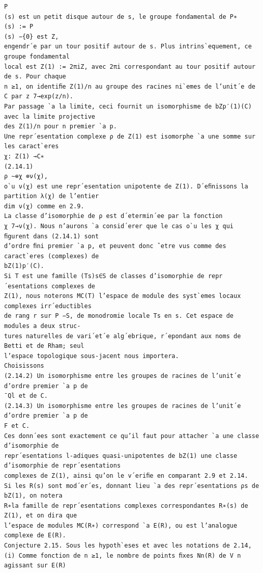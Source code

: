 \documentclass[11pt]{article}
\begin{document}
\begin{Verbatim}[breaklines=true,fontsize=\small]
P
(s) est un petit disque autour de s, le groupe fondamental de P∗
(s) := P
(s) −{0} est Z,
engendr´e par un tour positif autour de s. Plus intrins`equement, ce groupe fondamental
local est Z(1) := 2πiZ, avec 2πi correspondant au tour positif autour de s. Pour chaque
n ≥1, on identiﬁe Z(1)/n au groupe des racines ni`emes de l’unit´e de C par z 7→exp(z/n).
Par passage `a la limite, ceci fournit un isomorphisme de bZp′(1)(C) avec la limite projective
des Z(1)/n pour n premier `a p.
Une repr´esentation complexe ρ de Z(1) est isomorphe `a une somme sur les caract`eres
χ: Z(1) →C∗
(2.14.1)
ρ ∼⊕χ ⊗ν(χ),
o`u ν(χ) est une repr´esentation unipotente de Z(1). D´eﬁnissons la partition λ(χ) de l’entier
dim ν(χ) comme en 2.9.
La classe d’isomorphie de ρ est d´etermin´ee par la fonction
χ 7→ν(χ). Nous n’aurons `a consid´erer que le cas o`u les χ qui ﬁgurent dans (2.14.1) sont
d’ordre ﬁni premier `a p, et peuvent donc ˆetre vus comme des caract`eres (complexes) de
bZ(1)p′(C).
Si T est une famille (Ts)s∈S de classes d’isomorphie de repr´esentations complexes de
Z(1), nous noterons MC(T) l’espace de module des syst`emes locaux complexes irr´eductibles
de rang r sur P −S, de monodromie locale Ts en s. Cet espace de modules a deux struc-
tures naturelles de vari´et´e alg´ebrique, r´epondant aux noms de Betti et de Rham; seul
l’espace topologique sous-jacent nous importera.
Choisissons
(2.14.2) Un isomorphisme entre les groupes de racines de l’unit´e d’ordre premier `a p de
¯Ql et de C.
(2.14.3) Un isomorphisme entre les groupes de racines de l’unit´e d’ordre premier `a p de
F et C.
Ces donn´ees sont exactement ce qu’il faut pour attacher `a une classe d’isomorphie de
repr´esentations l-adiques quasi-unipotentes de bZ(1) une classe d’isomorphie de repr´esentations
complexes de Z(1), ainsi qu’on le v´eriﬁe en comparant 2.9 et 2.14.
Si les R(s) sont mod´er´es, donnant lieu `a des repr´esentations ρs de bZ(1), on notera
R∗la famille de repr´esentations complexes correspondantes R∗(s) de Z(1), et on dira que
l’espace de modules MC(R∗) correspond `a E(R), ou est l’analogue complexe de E(R).
Conjecture 2.15. Sous les hypoth`eses et avec les notations de 2.14,
(i) Comme fonction de n ≥1, le nombre de points ﬁxes Nn(R) de V n agissant sur E(R)


\end{Verbatim}
\end{document}
